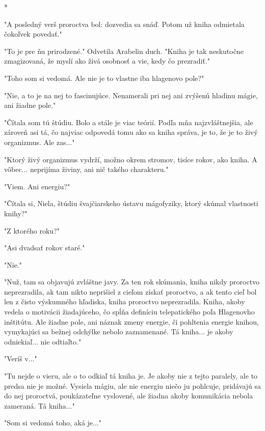 \documentclass{book}
\begin{document}
\begin{center}

*

\end{center}

"$ $A posledný verš proroctva bol: dozvedia sa snáď. Potom už kniha odmietala čokoľvek povedať."$ $ 

"$ $To je pre ňu prirodzené."$ $  Odvetila Arabelin duch. "$ $Kniha je tak neskutočne zmagizovaná, že myslí ako živá osobnosť a vie, kedy čo prezradiť."$ $ 

"$ $Toho som si vedomá. Ale nie je to vlastne iba hlagenovo pole?"$ $ 

"$ $Nie, a to je na nej to fascinujúce. Nenamerali pri nej ani zvýšenú hladinu mágie, ani žiadne pole."$ $ 

"$ $Čítala som tú štúdiu. Bolo a stále je viac teórií. Podľa mňa najzvláštnejšia, ale zároveň asi tá, čo najviac odpovedá tomu ako sa kniha správa, je to, že je to živý organizmus. Ale zas..."$ $ 

"$ $Ktorý živý organizmus vydrží, možno okrem stromov, tisíce rokov, ako kniha. A vôbec... neprijíma živiny, ani nič takého charakteru."$ $ 

"$ $Viem. Ani energiu?"$ $ 

"$ $Čítala si, Niela, štúdiu švajčiarskeho ústavu mágofyziky, ktorý skúmal vlastnosti knihy?"$ $ 

"$ $Z ktorého roku?"$ $ 

"$ $Asi dvadsať rokov staré."$ $ 

"$ $Nie."$ $ 

"$ $Nuž, tam sa objavujú zvláštne javy. Za ten rok skúmania, kniha nikdy proroctvo neprezradila, ak tam nikto neprišiel z cieľom získať proroctvo, a ak tento cieľ bol len z čisto výskumného hľadiska, kniha proroctvo neprezradila. Kniha, akoby vedela o motivácii žiadajúceho, čo spĺňa definíciu telepatického poľa Hlagenovho inštitútu. Ale žiadne pole, ani náznak zmeny energie, či pohltenia energie knihou, vymykajúci sa bežnej odchýlke nebolo zaznamenané. Tá kniha... je akoby odniekiaľ... nie odtiaľto."$ $ 

"$ $Veríš v..."$ $ 

"$ $Tu nejde o vieru, ale o to odkiaľ tá kniha je. Je akoby nie z tejto paralely, ale to predsa nie je možné. Vysiela mágiu, ale nie energiu niečo ju pohlcuje, pridávajú sa do nej proroctvá, poukázateľne vyslovené, ale žiadna akoby komunikácia nebola zameraná. Tá kniha..."$ $ 

"$ $Som si vedomá toho, aká je..."$ $ 
\end{document}
